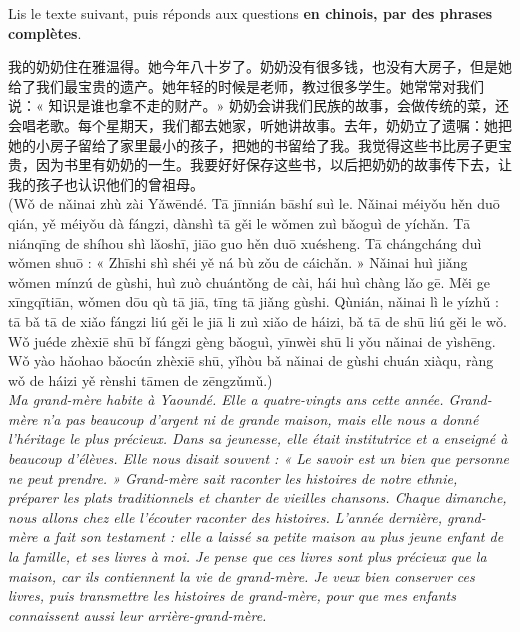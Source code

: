 \documentclass[11pt]{article}
\begin{document}
\begin{exercice}
Lis le texte suivant, puis réponds aux questions \textbf{en chinois, par des phrases complètes}.

\begin{textebox}
我的奶奶住在雅温得。她今年八十岁了。奶奶没有很多钱，也没有大房子，但是她给了我们最宝贵的遗产。她年轻的时候是老师，教过很多学生。她常常对我们说：« 知识是谁也拿不走的财产。» 奶奶会讲我们民族的故事，会做传统的菜，还会唱老歌。每个星期天，我们都去她家，听她讲故事。去年，奶奶立了遗嘱：她把她的小房子留给了家里最小的孩子，把她的书留给了我。我觉得这些书比房子更宝贵，因为书里有奶奶的一生。我要好好保存这些书，以后把奶奶的故事传下去，让我的孩子也认识他们的曾祖母。\\
(Wǒ de nǎinai zhù zài Yǎwēndé. Tā jīnnián bāshí suì le. Nǎinai méiyǒu hěn duō qián, yě méiyǒu dà fángzi, dànshì tā gěi le wǒmen zuì bǎoguì de yíchǎn. Tā niánqīng de shíhou shì lǎoshī, jiāo guo hěn duō xuésheng. Tā chángcháng duì wǒmen shuō : « Zhīshi shì shéi yě ná bù zǒu de cáichǎn. » Nǎinai huì jiǎng wǒmen mínzú de gùshi, huì zuò chuántǒng de cài, hái huì chàng lǎo gē. Měi ge xīngqītiān, wǒmen dōu qù tā jiā, tīng tā jiǎng gùshi. Qùnián, nǎinai lì le yízhǔ : tā bǎ tā de xiǎo fángzi liú gěi le jiā li zuì xiǎo de háizi, bǎ tā de shū liú gěi le wǒ. Wǒ juéde zhèxiē shū bǐ fángzi gèng bǎoguì, yīnwèi shū li yǒu nǎinai de yìshēng. Wǒ yào hǎohao bǎocún zhèxiē shū, yǐhòu bǎ nǎinai de gùshi chuán xiàqu, ràng wǒ de háizi yě rènshi tāmen de zēngzǔmǔ.)\\
\emph{Ma grand-mère habite à Yaoundé. Elle a quatre-vingts ans cette année. Grand-mère n'a pas beaucoup d'argent ni de grande maison, mais elle nous a donné l'héritage le plus précieux. Dans sa jeunesse, elle était institutrice et a enseigné à beaucoup d'élèves. Elle nous disait souvent : « Le savoir est un bien que personne ne peut prendre. » Grand-mère sait raconter les histoires de notre ethnie, préparer les plats traditionnels et chanter de vieilles chansons. Chaque dimanche, nous allons chez elle l'écouter raconter des histoires. L'année dernière, grand-mère a fait son testament : elle a laissé sa petite maison au plus jeune enfant de la famille, et ses livres à moi. Je pense que ces livres sont plus précieux que la maison, car ils contiennent la vie de grand-mère. Je veux bien conserver ces livres, puis transmettre les histoires de grand-mère, pour que mes enfants connaissent aussi leur arrière-grand-mère.}
\end{textebox}


\end{exercice}
\end{document}
